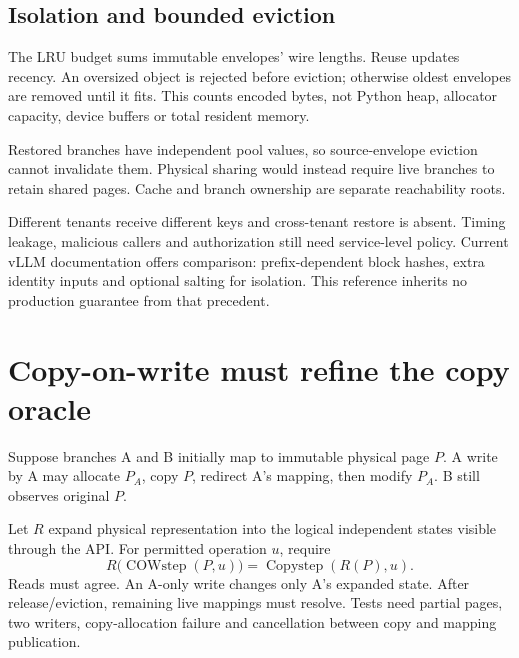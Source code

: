 \subsection{Isolation and bounded eviction}

The LRU budget sums immutable envelopes' wire lengths. Reuse updates recency.
An oversized object is rejected before eviction; otherwise oldest envelopes
are removed until it fits. This counts encoded bytes, not Python heap,
allocator capacity, device buffers or total resident memory.

Restored branches have independent pool values, so source-envelope eviction
cannot invalidate them. Physical sharing would instead require live branches
to retain shared pages. Cache and branch ownership are separate reachability
roots.

Different tenants receive different keys and cross-tenant restore is absent.
Timing leakage, malicious callers and authorization still need service-level
policy. Current vLLM documentation offers comparison: prefix-dependent block
hashes, extra identity inputs and optional salting for isolation.\cite{vllm-design}
This reference inherits no production guarantee from that precedent.

\section{Copy-on-write must refine the copy oracle}

Suppose branches A and B initially map to immutable physical page $P$.
A write by A may allocate $P_A$, copy $P$, redirect A's mapping, then modify
$P_A$. B still observes original $P$.


Let $R$ expand physical representation into the logical independent states
visible through the API. For permitted operation $u$, require
\[
 R\bigl(\operatorname{COWstep}(P,u)\bigr)
 =\operatorname{Copystep}(R(P),u).
\]
Reads must agree. An A-only write changes only A's expanded state. After
release/eviction, remaining live mappings must resolve. Tests need partial
pages, two writers, copy-allocation failure and cancellation between copy
and mapping publication.

